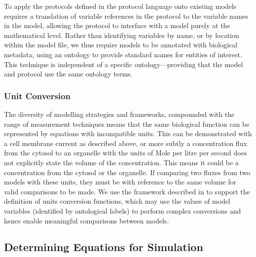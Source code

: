 \documentclass[preprint,authoryear,12pt]{elsarticle}
\begin{document}
To apply the protocols defined in the protocol language onto existing models requires a translation of variable references in the protocol to the variable names in the model, allowing the protocol to interface with a model purely at the mathematical level.
Rather than identifying variables by name, or by location within the model file, we thus require models to be annotated with biological metadata, using an ontology to provide standard names for entities of interest.
This technique is independent of a specific ontology---providing that the model and protocol use the same ontology terms.


\subsubsection{Unit Conversion}
\label{sec:methods-units}

The diversity of modelling strategies and frameworks, compounded with the range of measurement techniques means that the same biological function can be represented by equations with incompatible units.
This can be demonstrated with a cell membrane current as described above, or more subtly a concentration flux from the cytosol to an organelle with the units of Mole per litre per second does not explicitly state the volume of the concentration.
This means it could be a concentration from the cytosol or the organelle.
If comparing two fluxes from two models with these units, they must be with reference to the same volume for valid comparisons to be made.
We use the framework described in \citep{Cooper*.11:Considerations} to support the definition of units conversion functions, which may use the values of model variables (identified by ontological labels) to perform complex conversions and hence enable meaningful comparisons between models.

\subsection{Determining Equations for Simulation} 
\label{sec:proto-step2}
\end{document}
